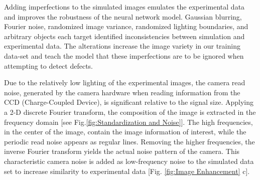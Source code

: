 \documentclass[prl,reprint,showpacs,floatfix,nofootinbib]{revtex4-1}
\begin{document}
Adding imperfections to the simulated images emulates the experimental data and improves the robustness\cite{goodfellow_explaining_2014}\cite{bishop_training_1995} of the neural network model. Gaussian blurring, Fourier noise, randomized image variance, randomized lighting boundaries, and arbitrary objects each target identified inconsistencies between simulation and experimental data. The alterations increase the image variety in our training data-set and teach the model that these imperfections are to be ignored when attempting to detect defects.

Due to the relatively low lighting of the experimental images, the camera read noise, generated by the camera hardware when reading information from the CCD (Charge-Coupled Device), is significant relative to the signal size. Applying a 2-D discrete Fourier transform, the composition of the image is extracted in the frequency domain\cite{kaur_periodic_nodate} [see Fig.\ref{fig:Standardization and Noise}]. The high frequencies, in the center of the image, contain the image information of interest, while the periodic read noise appears as regular lines. Removing the higher frequencies, the inverse Fourier transform yields the actual noise pattern of the camera. This characteristic camera noise is added as low-frequency noise to the simulated data set to increase similarity to experimental data [Fig. \ref{fig:Image Enhancement} c].
\end{document}
